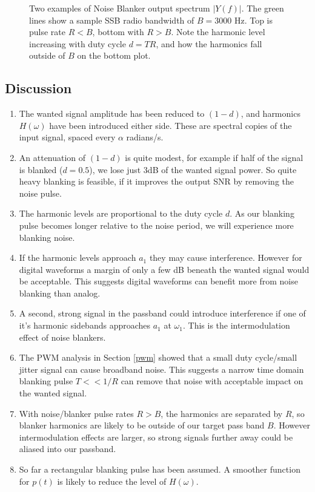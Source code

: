 \documentclass{article}
\begin{document}
\begin{figure}[h]
\caption{Two examples of Noise Blanker output spectrum $|Y(f)|$.  The green lines show a sample SSB radio bandwidth of $B=3000$ Hz. Top is pulse rate $R<B$, bottom with $R>B$.  Note the harmonic level increasing with duty cycle $d=TR$, and how the harmonics fall outside of $B$ on the bottom plot. }
\label{fig:blanker}
\begin{center}

\end{center}
\end{figure}

\subsection{Discussion}
\label{blanker_discussion}

\begin{enumerate}
\item The wanted signal amplitude has been reduced to $(1-d)$, and harmonics $H(\omega)$ have been introduced either side.  These are spectral copies of the input signal, spaced every $\alpha$ radians/s.
\item An attenuation of $(1-d)$ is quite modest, for example if half of the signal is blanked ($d=0.5$), we lose just 3dB of the wanted signal power.  So quite heavy blanking is feasible, if it improves the output SNR by removing the noise pulse.
\item The harmonic levels are proportional to the duty cycle $d$.  As our blanking pulse becomes longer relative to the noise period, we will experience more blanking noise.
\item If the harmonic levels approach $a_1$ they may cause interference.  However for digital waveforms a margin of only a few dB beneath the wanted signal would be acceptable.  This suggests digital waveforms can benefit more from noise blanking than analog. 
\item A second, strong signal in the passband could introduce interference if one of it's harmonic sidebands approaches $a_1$ at $\omega_1$.  This is the intermodulation effect of noise blankers.
\item The PWM analysis in Section \ref{pwm} showed that a small duty cycle/small jitter signal can cause broadband noise.  This suggests a narrow time domain blanking pulse $T<<1/R$ can remove that noise with acceptable impact on the wanted signal. 
\item With noise/blanker pulse rates $R>B$, the harmonics are separated by $R$, so blanker harmonics are likely to be outside of our target pass band $B$.  However intermodulation effects are larger, so strong signals further away could be aliased into our passband. 
\item So far a rectangular blanking pulse has been assumed. A smoother function for $p(t)$ is likely to reduce the level of $H(\omega)$. 
\end{enumerate}
\end{document}
